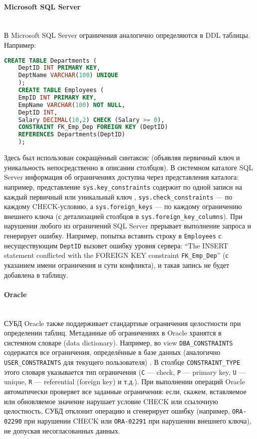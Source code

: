 \paragraph{Microsoft SQL Server} ~\\ 
 В Microsoft SQL Server ограничения аналогично определяются в DDL таблицы. Например:
 \begin{lstlisting}[language=SQL]
    CREATE TABLE Departments (
    DeptID INT PRIMARY KEY,
    DeptName VARCHAR(100) UNIQUE
    );
    CREATE TABLE Employees (
    EmpID INT PRIMARY KEY,
    EmpName VARCHAR(100) NOT NULL,
    DeptID INT,
    Salary DECIMAL(10,2) CHECK (Salary >= 0),
    CONSTRAINT FK_Emp_Dep FOREIGN KEY (DeptID)
    REFERENCES Departments(DeptID)
    );
 \end{lstlisting}

 Здесь был использован сокращённый синтаксис (объявляя первичный ключ и уникальность непосредственно в описании столбцов). В системном каталоге SQL Server информация об ограничениях доступна через представления каталога: например, представление \texttt{sys.key\_constraints} содержит по одной записи на каждый первичный или уникальный ключ \autocite{msSysKeyConstraints}, \texttt{sys.check\_constraints} — по каждому CHECK-условию, а \texttt{sys.foreign\_keys} — по каждому ограничению внешнего ключа (с детализацией столбцов в \texttt{sys.foreign\_key\_columns}). При нарушении любого из ограничений SQL Server прерывает выполнение запроса и генерирует ошибку. Например, попытка вставить строку в \texttt{Employees} с несуществующим \texttt{DeptID} вызовет ошибку уровня сервера: \enquote{The INSERT statement conflicted with the FOREIGN KEY constraint \texttt{FK\_Emp\_Dep}} (с указанием имени ограничения и сути конфликта), и такая запись не будет добавлена в таблицу. 

\paragraph{Oracle} ~\\

 СУБД Oracle также поддерживает стандартные ограничения целостности при определении таблиц. Метаданные об ограничениях в Oracle хранятся в системном словаре (data dictionary). Например, во view \texttt{DBA\_CONSTRAINTS} содержатся все ограничения, определённые в базе данных (аналогично \texttt{USER\_CONSTRAINTS} для текущего пользователя) \autocite[§4.216]{oracledbdoc1}. В столбце \texttt{CONSTRAINT\_TYPE} этого словаря указывается тип ограничения (\texttt{C} — check, \texttt{P} — primary key, \texttt{U} — unique, \texttt{R} — referential (foreign key) и т.д.). При выполнении операций Oracle автоматически проверяет все заданные ограничения: если, скажем, вставляемое или обновляемое значение нарушает условие CHECK или ссылочную целостность, СУБД отклонит операцию и сгенерирует ошибку (например, \texttt{ORA-02290} при нарушении CHECK или \texttt{ORA-02291} при нарушении внешнего ключа), не допуская несогласованных данных.





